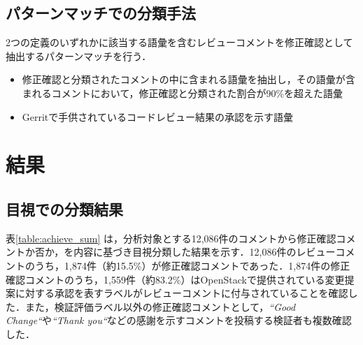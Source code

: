 \documentclass[11pt]{jreport}
\newcommand{\todo}[1]{\colorbox{yellow}{{\bf TODO}:}{\color{red} {\textbf{[#1]}}}}
\begin{document}

\subsection{パターンマッチでの分類手法}
2つの定義のいずれかに該当する語彙を含むレビューコメントを修正確認として抽出するパターンマッチを行う．

\begin{itemize}
\item 修正確認と分類されたコメントの中に含まれる語彙を抽出し，その語彙が含まれるコメントにおいて，修正確認と分類された割合が90\%を超えた語彙
\item Gerritで手供されているコードレビュー結果の承認を示す語彙
\end{itemize}


\section{結果}
\subsection{目視での分類結果}
表\ref{table:achieve_sum} は，分析対象とする12,086件のコメントから修正確認コメントか否か，を内容に基づき目視分類した結果を示す．12,086件のレビューコメントのうち，1,874件（約15.5\%）が修正確認コメントであった．1,874件の修正確認コメントのうち，1,559件（約83.2\%）はOpenStackで提供されている変更提案に対する承認を表すラベルがレビューコメントに付与されていることを確認した．また，検証評価ラベル以外の修正確認コメントとして，\textit{``Good Change``}や\textit{``Thank you``}などの感謝を示すコメントを投稿する検証者も複数確認した．
\end{document}
